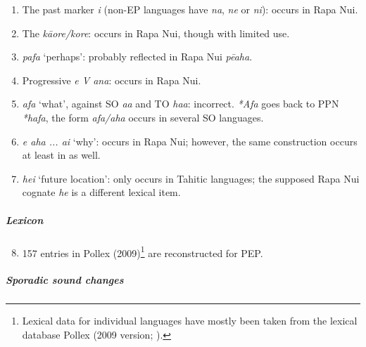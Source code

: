 \settowidth{}
\begin{enumerate}
\item 
The past  marker \textit{i} (non-EP languages have \textit{na}, \textit{ne} or \textit{ni}): occurs in Rapa Nui.  

\item 
The  \textit{k}\textit{āore/}\textit{kore}: occurs in Rapa Nui, though with limited use.   

\item 
\textit{pafa} ‘perhaps’: probably reflected in Rapa Nui \textit{pēaha}.   

\item 
Progressive \textit{e V {\ꞌ}ana}: occurs in Rapa Nui.   

\item 
{}\textit{afa} ‘what’, against SO \textit{aa} and TO \textit{haa}: incorrect. \textit{*Afa} goes back to PPN \textit{*hafa}, the form \textit{afa/aha} occurs in several SO languages.   

\item 
\textit{e aha ... ai} ‘why’: occurs in Rapa Nui; however, the same construction occurs at least in  as well.   

\item 
\textit{hei} ‘future location’: only occurs in Tahitic languages; the supposed Rapa Nui cognate \textit{he} is a different lexical item.   

\end{enumerate}

\subparagraph{Lexicon}

\begin{enumerate}
\setcounter{enumi}{7}
\item 
157 entries in Pollex (2009)\footnote{\label{fn:16}Lexical data for individual languages have mostly been taken from the lexical database Pollex (2009 version; \citealt{GreenhillClark2011}).} are reconstructed for PEP.

\end{enumerate}

\subparagraph{Sporadic sound changes} \citep[131]{Marck2000}

